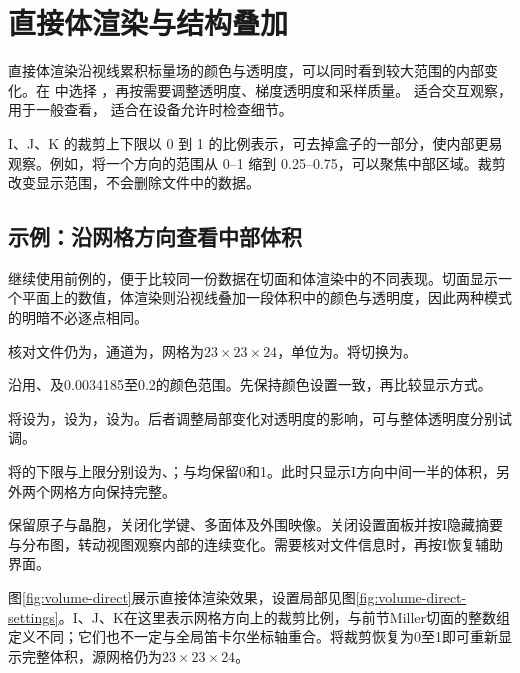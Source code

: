 \section{直接体渲染与结构叠加}

直接体渲染沿视线累积标量场的颜色与透明度，可以同时看到较大范围的内部变化。在 中选择 ，再按需要调整透明度、梯度透明度和采样质量。 适合交互观察， 用于一般查看， 适合在设备允许时检查细节。

I、J、K 的裁剪上下限以 0 到 1 的比例表示，可去掉盒子的一部分，使内部更易观察。例如，将一个方向的范围从 0--1 缩到 0.25--0.75，可以聚焦中部区域。裁剪改变显示范围，不会删除文件中的数据。

\subsection{示例：沿网格方向查看中部体积}

继续使用前例的，便于比较同一份数据在切面和体渲染中的不同表现。切面显示一个平面上的数值，体渲染则沿视线叠加一段体积中的颜色与透明度，因此两种模式的明暗不必逐点相同。

\begin{steps}
  \item 核对文件仍为，通道为，网格为$23\times23\times24$，单位为。将切换为。
  \item 沿用、及0.0034185至0.2的颜色范围。先保持颜色设置一致，再比较显示方式。
  \item 将设为，设为，设为。后者调整局部变化对透明度的影响，可与整体透明度分别试调。
  \item 将的下限与上限分别设为、；与均保留0和1。此时只显示I方向中间一半的体积，另外两个网格方向保持完整。
  \item 保留原子与晶胞，关闭化学键、多面体及外围映像。关闭设置面板并按I隐藏摘要与分布图，转动视图观察内部的连续变化。需要核对文件信息时，再按I恢复辅助界面。
\end{steps}

图\ref{fig:volume-direct}展示直接体渲染效果，设置局部见图\ref{fig:volume-direct-settings}。I、J、K在这里表示网格方向上的裁剪比例，与前节Miller切面的整数组定义不同；它们也不一定与全局笛卡尔坐标轴重合。将裁剪恢复为0至1即可重新显示完整体积，源网格仍为$23\times23\times24$。

